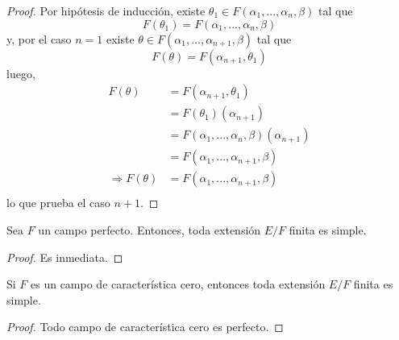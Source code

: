 \documentclass[12pt]{report}
\theoremstyle{largebreak}
\begin{document}
\begin{proof}
        Por hipótesis de inducción, existe $\theta_1\in F(\alpha_1,...,\alpha_n,\beta)$ tal que
        \begin{equation*}
            F(\theta_1)=F(\alpha_1,...,\alpha_n,\beta)
        \end{equation*}
        y, por el caso $n=1$ existe $\theta\in F(\alpha_1,...,\alpha_{ n+1},\beta)$ tal que
        \begin{equation*}
            F(\theta)=F(\alpha_{n+1},\theta_1)
        \end{equation*}
        luego,
        \begin{equation*}
            \begin{split}
                F(\theta)&=F(\alpha_{n+1},\theta_1)\\
                &=F(\theta_1)(\alpha_{ n+1})\\
                &=F(\alpha_1,...,\alpha_n,\beta)(\alpha_{ n+1})\\
                &=F(\alpha_1,...,\alpha_{ n+1},\beta)\\
                \Rightarrow F(\theta)&=F(\alpha_1,...,\alpha_{ n+1},\beta)\\
            \end{split}
        \end{equation*}
        lo que prueba el caso $n+1$.
    \end{proof}

    \begin{cor}
        Sea $F$ un campo perfecto. Entonces, toda extensión $E/F$ finita es simple.
    \end{cor}

    \begin{proof}
        Es inmediata.
    \end{proof}

    \begin{cor}
        Si $F$ es un campo de característica cero, entonces toda extensión $E/F$ finita es simple.
    \end{cor}

    \begin{proof}
        Todo campo de característica cero es perfecto.
    \end{proof}
\end{document}
